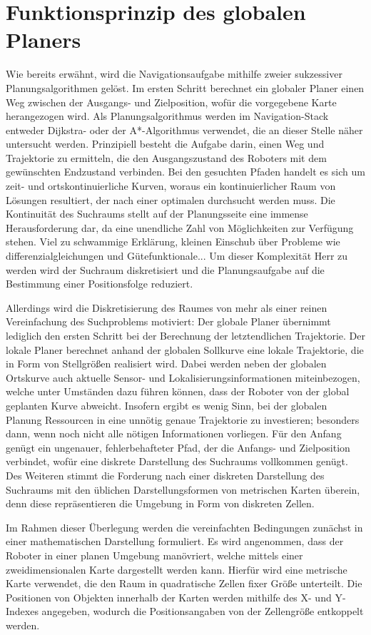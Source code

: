 \section{Funktionsprinzip des globalen Planers}
Wie bereits erwähnt, wird die Navigationsaufgabe mithilfe zweier sukzessiver Planungsalgorithmen gelöst. Im ersten Schritt berechnet ein globaler Planer einen Weg zwischen der Ausgangs- und Zielposition, wofür die vorgegebene Karte herangezogen wird. Als Planungsalgorithmus werden im Navigation-Stack entweder Dijkstra- oder der A*-Algorithmus verwendet, die an dieser Stelle näher untersucht werden. Prinzipiell besteht die Aufgabe darin, einen Weg und Trajektorie zu ermitteln, die den Ausgangszustand des Roboters mit dem gewünschten Endzustand verbinden. Bei den gesuchten Pfaden handelt es sich um zeit- und ortskontinuierliche Kurven, woraus ein kontinuierlicher Raum von Lösungen resultiert, der nach einer optimalen durchsucht werden muss. Die Kontinuität des Suchraums stellt auf der Planungsseite eine immense Herausforderung dar, da eine unendliche Zahl von Möglichkeiten zur Verfügung stehen. {\color{red} Viel zu schwammige Erklärung, kleinen Einschub über Probleme wie differenzialgleichungen und Gütefunktionale...} Um dieser Komplexität Herr zu werden wird der Suchraum diskretisiert und die Planungsaufgabe auf die Bestimmung einer Positionsfolge reduziert.

Allerdings wird die Diskretisierung des Raumes von mehr als einer reinen Vereinfachung des Suchproblems motiviert: Der globale Planer übernimmt lediglich den ersten Schritt bei der Berechnung der letztendlichen Trajektorie. Der lokale Planer berechnet anhand der globalen Sollkurve eine lokale Trajektorie, die in Form von Stellgrößen realisiert wird. Dabei werden neben der globalen Ortskurve auch aktuelle Sensor- und Lokalisierungsinformationen miteinbezogen, welche unter Umständen dazu führen können, dass der Roboter von der global geplanten Kurve abweicht. Insofern ergibt es wenig Sinn, bei der globalen Planung Ressourcen in eine unnötig genaue Trajektorie zu investieren; besonders dann, wenn noch nicht alle nötigen Informationen vorliegen. Für den Anfang genügt ein ungenauer, fehlerbehafteter Pfad, der die Anfangs- und Zielposition verbindet, wofür eine diskrete Darstellung des Suchraums vollkommen genügt. Des Weiteren stimmt die Forderung nach einer diskreten Darstellung des Suchraums mit den üblichen Darstellungsformen von metrischen Karten überein, denn diese repräsentieren die Umgebung in Form von diskreten Zellen.

Im Rahmen dieser Überlegung werden die vereinfachten Bedingungen zunächst in einer mathematischen Darstellung formuliert. Es wird angenommen, dass der Roboter in einer planen Umgebung manövriert, welche mittels einer zweidimensionalen Karte dargestellt werden kann. Hierfür wird eine metrische Karte verwendet, die den Raum in quadratische Zellen fixer Größe unterteilt. Die Positionen von Objekten innerhalb der Karten werden mithilfe des X- und Y-Indexes angegeben, wodurch die Positionsangaben von der Zellengröße entkoppelt werden.